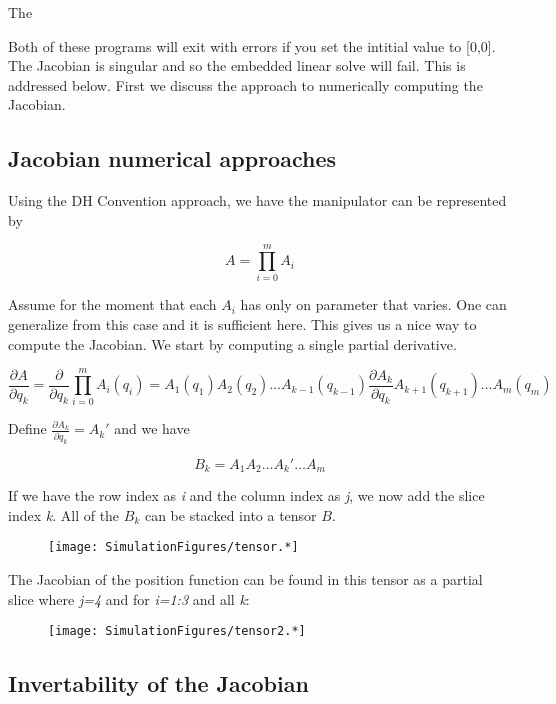 The

Both of these programs will exit with errors if you set the intitial
value to {[}0,0{]}. The Jacobian is singular and so the embedded linear
solve will fail. This is addressed below. First we discuss the approach
to numerically computing the Jacobian.

\hypertarget{numerical-jacobian-1}{%
\subsection{Jacobian numerical approaches}\label{numerical-jacobian-1}}

Using the DH Convention approach, we have the manipulator can be
represented by

\[A = \prod_{i=0}^m A_i\]

Assume for the moment that each \(A_i\) has only on parameter that
varies. One can generalize from this case and it is sufficient here.
This gives us a nice way to compute the Jacobian. We start by computing
a single partial derivative.

\[\displaystyle \frac{\partial A}{\partial q_k} = \displaystyle \frac{\partial}{\partial q_k} \prod_{i=0}^m A_i (q_i)=
\displaystyle A_1(q_1) A_2(q_2) \dots A_{k-1}(q_{k-1}) \frac{\partial A_k}{\partial q_k} A_{k+1}(q_{k+1})\dots A_m (q_m)\]

Define \(\frac{\partial A_k}{\partial q_k} = A_k'\) and we have

\[B_k = A_1A_2 \dots A_k' \dots A_m\]

If we have the row index as \emph{i} and the column index as \emph{j},
we now add the slice index \emph{k}. All of the \(B_k\) can be stacked
into a tensor \(B\).

\begin{figure}
\centering
\texttt{[image: SimulationFigures/tensor.*]}
\caption{}
\end{figure}

The Jacobian of the position function can be found in this tensor as a
partial slice where \emph{j=4} and for \emph{i=1:3} and all \emph{k}:

\begin{figure}
\centering
\texttt{[image: SimulationFigures/tensor2.*]}
\caption{}
\end{figure}

\hypertarget{invertability-of-the-jacobian}{%
\subsection{Invertability of the
Jacobian}\label{invertability-of-the-jacobian}}

